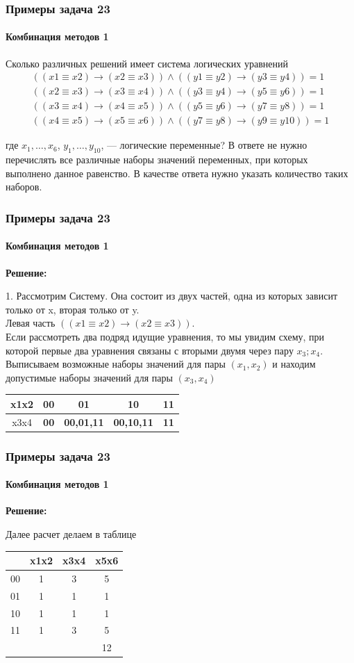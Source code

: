 \begin{frame}[t]
\frametitle{Примеры задача 23}
\framesubtitle{Комбинация методов 1}
Сколько различных решений имеет система логических уравнений 
\begin{align*}
((x1 \equiv x2)\rightarrow(x2 \equiv x3)) \wedge ((y1 \equiv y2)\rightarrow(y3 \equiv y4)) = 1\\
((x2 \equiv x3)\rightarrow(x3 \equiv x4)) \wedge ((y3 \equiv y4)\rightarrow(y5 \equiv y6)) = 1\\
((x3 \equiv x4)\rightarrow(x4 \equiv x5)) \wedge ((y5 \equiv y6)\rightarrow(y7 \equiv y8)) = 1\\
((x4 \equiv x5)\rightarrow(x5 \equiv x6)) \wedge ((y7 \equiv y8)\rightarrow(y9 \equiv y10)) = 1
\end{align*}	

где $x_1, \ldots, x_{6}$, $y_1, \ldots, y_{10}$, --- логические переменные? В ответе не нужно перечислять все различные наборы значений переменных, при которых выполнено данное равенство. В качестве ответа нужно указать количество таких наборов.
\end{frame}



\begin{frame}[t]
\frametitle{Примеры задача 23}
\framesubtitle{Комбинация методов 1}

\textbf{Решение: }

1. Рассмотрим Систему. Она состоит из двух частей, одна из которых зависит только от x, вторая только от y. \\
Левая часть $((x1 \equiv x2)\rightarrow(x2 \equiv x3))$.\\
Если рассмотреть два подряд идущие уравнения, то мы увидим схему, при которой первые два уравнения связаны с вторыми двумя через пару $x_3;x_4$.\\
Выписываем возможные наборы значений для пары $(x_1,x_2)$ и находим допустимые наборы значений для пары $(x_3,x_4)$ \\ 	\pause 
\begin{tabular}{|c|c|c|c|c|}
\hline 
x1x2 & 00 & 01 & 10 & 11\tabularnewline
\hline 
\hline 
x3x4 & \textbf{00} & \textbf{00,01,11} & \textbf{00,10,11} & \textbf{11}\tabularnewline
\hline 
\end{tabular} 	\pause 


\end{frame}

\begin{frame}[t]
\frametitle{Примеры задача 23}
\framesubtitle{Комбинация методов 1}

\textbf{Решение: }

Далее расчет делаем в таблице\\
\begin{tabular}{|c|c|c|c|}
\hline 
& x1x2 & x3x4 & x5x6 \tabularnewline
\hline 
00 & 1 & 3 & 5 \tabularnewline
\hline
01 & 1 & 1 & 1   \tabularnewline
\hline
10 & 1 & 1 & 1 \tabularnewline
\hline 
11 & 1 & 3 & 5  \tabularnewline
\hline 
   &   &   &    12 \tabularnewline
\hline	
\end{tabular}


\end{frame}

